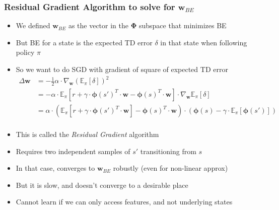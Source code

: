 \documentclass[handout]{beamer}
\newcommand{\bphi}{\bm{\Phi}}
\newcommand{\bw}{\bm{w}}
\begin{document}
\begin{frame}
\frametitle{Residual Gradient Algorithm to solve for $\bm{w}_{BE}$}
\pause
\begin{itemize}[<+->]
\item We defined $\bm{w}_{BE}$ as the vector in the $\bphi$ subspace that minimizes BE
\item But BE for a state is the expected TD error $\delta$ in that state when following policy $\pi$
\item So we want to do SGD with gradient of square of expected TD error
\begin{align*}
\Delta \bw & = - \frac{1}{2} \alpha \cdot \nabla_{\bw} (\mathbb{E}_{\pi}[\delta])^2\\
& = - \alpha \cdot \mathbb{E}_{\pi}[r + \gamma \cdot \bm{\phi}(s')^T \cdot \bw - \bm{\phi}(s)^T \cdot \bw] \cdot \nabla_{\bw} \mathbb{E}_{\pi}[\delta]\\
& = \alpha \cdot (\mathbb{E}_{\pi}[r + \gamma \cdot \bm{\phi}(s')^T \cdot \bw] - \bm{\phi}(s)^T \cdot \bw) \cdot (\bm{\phi}(s) - \gamma \cdot \mathbb{E}_{\pi}[\bm{\phi}(s')])\\
\end{align*}
\item  This is called the {\em Residual Gradient} algorithm
\item Requires two independent samples of $s'$ transitioning from $s$
\item In that case, converges to $\bm{w}_{BE}$ robustly (even for non-linear approx)
\item But it is slow, and doesn't converge to a desirable place
\item Cannot learn if we can only access features, and not underlying states
\end{itemize}
\end{frame}
\end{document}
